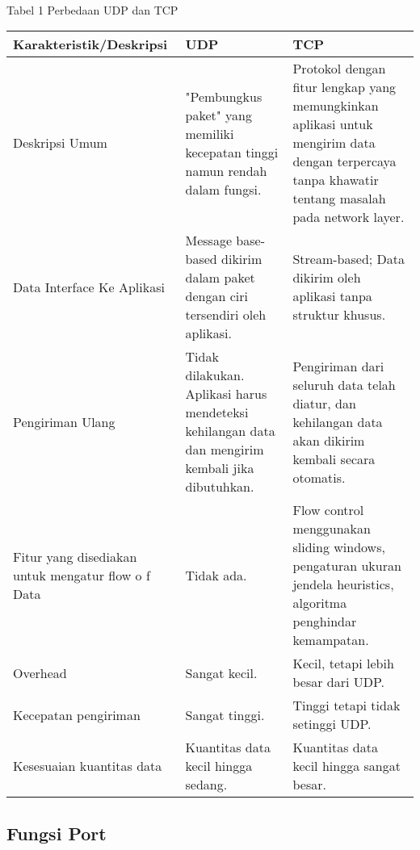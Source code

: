 \documentclass[12pt,a4paper]{article}
\begin{document}
\paragraph{}

Tabel 1 Perbedaan UDP dan TCP\\
\begin{tabular}{|p{4.5cm}|p{5cm}|p{5cm}|}

\hline
Karakteristik/Deskripsi & UDP & TCP \\
\hline
Deskripsi Umum & "Pembungkus paket" yang
memiliki kecepatan tinggi
namun rendah dalam
fungsi. &Protokol dengan fitur
lengkap yang
memungkinkan aplikasi
untuk mengirim data
dengan terpercaya tanpa
khawatir tentang masalah
pada network layer.\\
\hline

\hline
Data Interface Ke
Aplikasi & Message base-based dikirim
dalam paket dengan ciri
tersendiri oleh aplikasi. & Stream-based; Data dikirim
oleh aplikasi tanpa
struktur khusus.\\
\hline

\hline
Pengiriman Ulang & Tidak dilakukan. Aplikasi
harus mendeteksi
kehilangan data dan
mengirim kembali jika
dibutuhkan. & Pengiriman dari seluruh
data telah diatur, dan
kehilangan data akan
dikirim kembali secara
otomatis.\\
\hline

\hline
Fitur yang
disediakan untuk
mengatur flow o f
Data & Tidak ada. & Flow control menggunakan
sliding windows,
pengaturan ukuran jendela
heuristics, algoritma
penghindar kemampatan.\\
\hline

\hline
Overhead & Sangat kecil. & Kecil, tetapi lebih besar dari
UDP.\\
\hline

\hline
Kecepatan
pengiriman & Sangat tinggi. & Tinggi tetapi tidak setinggi
UDP.\\
\hline

\hline
Kesesuaian
kuantitas data & Kuantitas data kecil hingga
sedang. & Kuantitas data kecil hingga
sangat besar.\\
\hline

\end{tabular}



\subsection{Fungsi Port}
\end{document}
